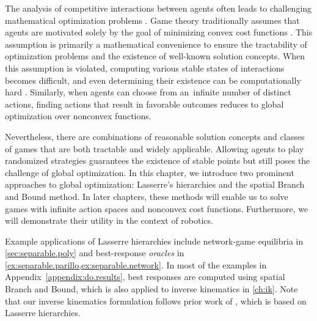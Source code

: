 The analysis of competitive interactions between agents often leads to challenging mathematical optimization problems \cite{daskalakischallenge}. Game theory traditionally assumes that agents are motivated solely by the goal of minimizing convex cost functions \cite{Brooks2023}. This assumption is primarily a mathematical convenience to ensure the tractability of optimization problems and the existence of well-known solution concepts. When this assumption is violated, computing various stable states of interactions becomes difficult, and even determining their existence can be computationally hard \cite{daskalakis.golowich.ea:stay-on-the-ridge}. Similarly, when agents can choose from an~infinite number of distinct actions, finding actions that result in favorable outcomes reduces to global optimization over nonconvex functions.

Nevertheless, there are combinations of reasonable solution concepts and classes of games that are both tractable and widely applicable. Allowing agents to play randomized strategies guarantees the existence of stable points but still poses the challenge of global optimization. In this chapter, we introduce two prominent approaches to global optimization: Lasserre's hierarchies and the spatial Branch and Bound method. In later chapters, these methods will enable us to solve games with infinite action spaces and nonconvex cost functions. Furthermore, we will demonstrate their utility in the context of robotics.

Example applications of Lasserre hierarchies include network-game equilibria in \cref{sec:separable.poly} and best-response \emph{oracles} in \cref{ex:separable.parillo,ex:separable.network}. In most of the examples in Appendix~\ref{appendix:do.results}, best responses are computed using spatial Branch and Bound, which is also applied to inverse kinematics in \cref{ch:ik}. Note that our inverse kinematics formulation follows prior work of \textcite{trutman2022globally}, which is based on Lasserre hierarchies.